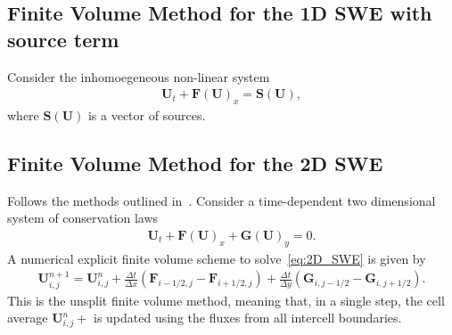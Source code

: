 \subsection{Finite Volume Method for the 1D SWE with source term}
Consider the inhomoegeneous non-linear system
\begin{align*}
    \mathbf{U}_t + \mathbf{F(U)}_x = \mathbf{S(U)},
\end{align*} 
where $\mathbf{S(U)}$ is a vector of sources. 



\subsection{Finite Volume Method for the 2D SWE}
Follows the methods outlined in~\cite{Toro2009-Riemann}.
Consider a time-dependent two dimensional system of conservation laws
\begin{align}\label{eq:2D_SWE}
    \mathbf{U}_t + \mathbf{F(U)}_x + \mathbf{G(U)}_y = 0.
\end{align}
A numerical explicit finite volume scheme to solve~\eqref{eq:2D_SWE} is given by
\begin{align}
    \mathbf{U}_{i,j}^{n+1} = \mathbf{U}_{i,j}^n + \frac{\Delta t}{\Delta x}(\mathbf{F}_{i-1/2,j} - \mathbf{F}_{i+1/2,j}) + \frac{\Delta t}{\Delta y}(\mathbf{G}_{i,j-1/2} - \mathbf{G}_{i,j+1/2}).
\end{align}
This is the unsplit finite volume method, meaning that, in a single step, the cell average $\mathbf{U}_{i,j}^n+$ is updated using the fluxes from all intercell boundaries.

